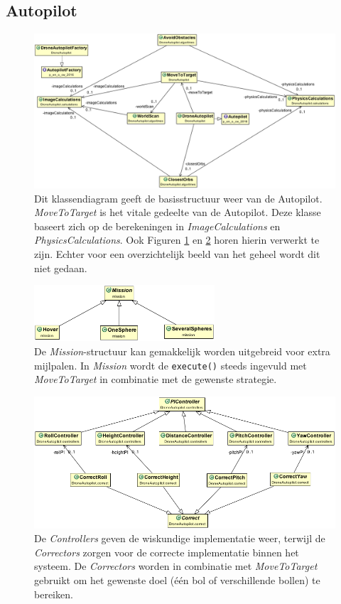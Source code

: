 \subsection{Autopilot}
	\begin{figure}[H]
		\centering
		\includegraphics[width=1\textwidth]{AutopilotDiagram.png}
		\caption{Dit klassendiagram geeft de basisstructuur weer van de Autopilot. \textit{MoveToTarget} is het vitale gedeelte van de Autopilot. Deze klasse baseert zich op de berekeningen in \textit{ImageCalculations} en \textit{PhysicsCalculations}. Ook Figuren \ref{fig: mission} en \ref{fig: control} horen hierin verwerkt te zijn. Echter voor een overzichtelijk beeld van het geheel wordt dit niet gedaan. }
	\end{figure}
	\begin{figure}[H]
		\centering
		\includegraphics[width=0.6\textwidth]{MissionDiagram.png}
		\caption{De \textit{Mission}-structuur kan gemakkelijk worden uitgebreid voor extra mijlpalen. In \textit{Mission} wordt de \texttt{execute()} steeds ingevuld met \textit{MoveToTarget} in combinatie met de gewenste strategie.}
		\label{fig: mission}
	\end{figure}
	\begin{figure}[H]
		\centering
		\includegraphics[width=1\textwidth]{ControlDiagram.png}
		\caption{De \textit{Controllers} geven de wiskundige implementatie weer, terwijl de \textit{Correctors} zorgen voor de correcte implementatie binnen het systeem. De \textit{Correctors} worden in combinatie met \textit{MoveToTarget} gebruikt om het gewenste doel (één bol of verschillende bollen) te bereiken.}
		\label{fig: control}
	\end{figure}
